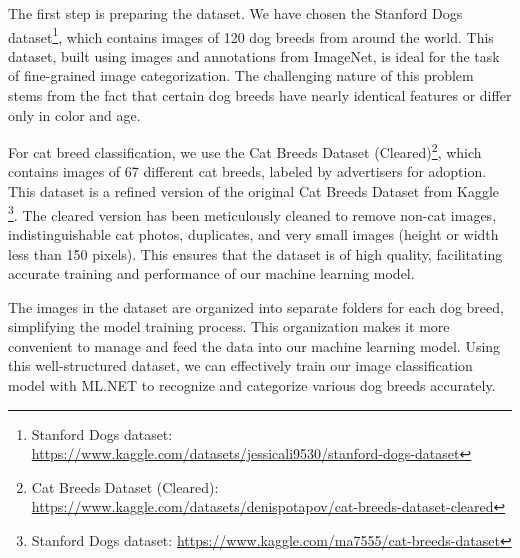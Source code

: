 The first step is preparing the dataset. We have chosen the Stanford Dogs dataset\footnote{Stanford Dogs dataset: \url{https://www.kaggle.com/datasets/jessicali9530/stanford-dogs-dataset}}, which contains images of 120 dog breeds from around 
the world. This dataset, built using images and annotations from ImageNet, is ideal for the task of fine-grained image categorization. 
The challenging nature of this problem stems from the fact that certain dog breeds have nearly identical features or differ only in color and age.

For cat breed classification, we use the Cat Breeds Dataset (Cleared)\footnote{Cat Breeds Dataset (Cleared): \url{https://www.kaggle.com/datasets/denispotapov/cat-breeds-dataset-cleared}}, which contains images of 67 different cat breeds, labeled by advertisers for 
adoption. This dataset is a refined version of the original Cat Breeds Dataset from Kaggle \footnote{Stanford Dogs dataset: \url{https://www.kaggle.com/ma7555/cat-breeds-dataset}}. 
The cleared version has been meticulously cleaned to remove non-cat images, indistinguishable cat photos, duplicates, and very small images 
(height or width less than 150 pixels). This ensures that the dataset is of high quality, facilitating accurate training and performance of our 
machine learning model.

The images in the dataset are organized into separate folders for each dog breed, simplifying the model training process. This organization 
makes it more convenient to manage and feed the data into our machine learning model. Using this well-structured dataset, we can effectively 
train our image classification model with ML.NET to recognize and categorize various dog breeds accurately.

